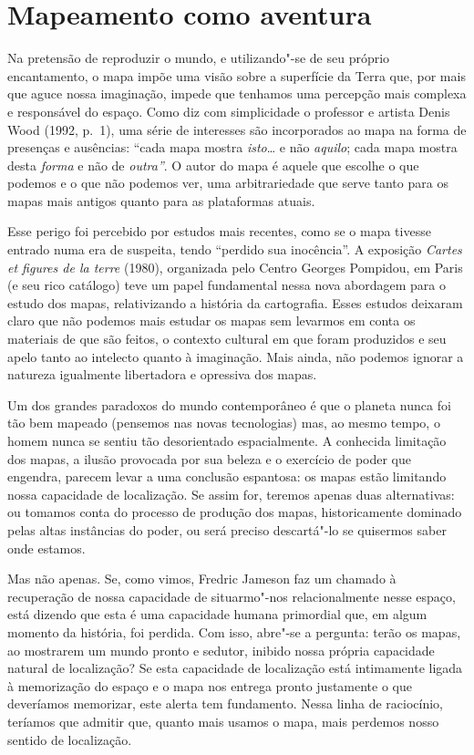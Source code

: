 \chapter{Mapeamento como aventura}

Na pretensão de reproduzir o mundo, e utilizando"-se de seu próprio
encantamento, o mapa impõe uma visão sobre a superfície da Terra que,
por mais que aguce nossa imaginação, impede que tenhamos uma percepção
mais complexa e responsável do espaço. Como diz com simplicidade o
professor e artista Denis Wood (1992, p.~1), uma série de interesses são
incorporados ao mapa na forma de presenças e ausências: ``cada mapa
mostra \emph{isto}\ldots{} e não \emph{aquilo}; cada mapa mostra desta
\emph{forma} e não de \emph{outra''}. O autor do mapa é aquele que
escolhe o que podemos e o que não podemos ver, uma arbitrariedade que
serve tanto para os mapas mais antigos quanto para as plataformas
atuais.

Esse perigo foi percebido por estudos mais recentes, como se o mapa
tivesse entrado numa era de suspeita, tendo ``perdido sua inocência''. A
exposição \emph{Cartes et figures de la terre} (1980), organizada pelo
Centro Georges Pompidou, em Paris (e seu rico catálogo) teve um papel
fundamental nessa nova abordagem para o estudo dos mapas, relativizando
a história da cartografia. Esses estudos deixaram claro que não podemos
mais estudar os mapas sem levarmos em conta os materiais de que são
feitos, o contexto cultural em que foram produzidos e seu apelo tanto ao
intelecto quanto à imaginação. Mais ainda, não podemos ignorar a
natureza igualmente libertadora e opressiva dos mapas.

Um dos grandes paradoxos do mundo contemporâneo é que o planeta nunca
foi tão bem mapeado (pensemos nas novas tecnologias) mas, ao mesmo
tempo, o homem nunca se sentiu tão desorientado espacialmente. A
conhecida limitação dos mapas, a ilusão provocada por sua beleza e o
exercício de poder que engendra, parecem levar a uma conclusão
espantosa: os mapas estão limitando nossa capacidade de localização. Se
assim for, teremos apenas duas alternativas: ou tomamos conta do
processo de produção dos mapas, historicamente dominado pelas altas
instâncias do poder, ou será preciso descartá"-lo se quisermos saber onde
estamos.

Mas não apenas. Se, como vimos, Fredric Jameson faz um chamado à
recuperação de nossa capacidade de situarmo"-nos relacionalmente nesse
espaço, está dizendo que esta é uma capacidade humana primordial que, em
algum momento da história, foi perdida. Com isso, abre"-se a pergunta:
terão os mapas, ao mostrarem um mundo pronto e sedutor, inibido nossa
própria capacidade natural de localização? Se esta capacidade de
localização está intimamente ligada à memorização do espaço e o mapa nos
entrega pronto justamente o que deveríamos memorizar, este alerta tem
fundamento. Nessa linha de raciocínio, teríamos que admitir que, quanto
mais usamos o mapa, mais perdemos nosso sentido de localização.

